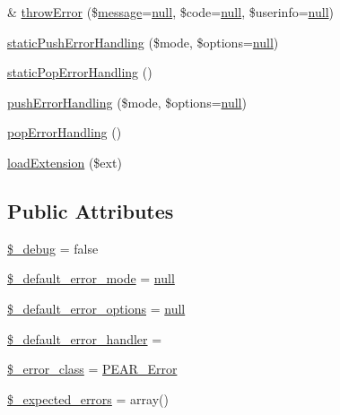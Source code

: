 \begin{DoxyCompactItemize}
\item 
\& \hyperlink{classPEAR_a146f08ee812450913835040d43b2c832}{throw\+Error} (\$\hyperlink{classmessage}{message}=\hyperlink{modernizr_8min_8js_a286f9ec831c5e676eeb493248eab9575}{null}, \$code=\hyperlink{modernizr_8min_8js_a286f9ec831c5e676eeb493248eab9575}{null}, \$userinfo=\hyperlink{modernizr_8min_8js_a286f9ec831c5e676eeb493248eab9575}{null})
\item 
\hyperlink{classPEAR_a5bfc268ba255bb88c2f98bb5f9f0a124}{static\+Push\+Error\+Handling} (\$mode, \$options=\hyperlink{modernizr_8min_8js_a286f9ec831c5e676eeb493248eab9575}{null})
\item 
\hyperlink{classPEAR_ad558eaf2cadc1eb2afa180f7a75bcab3}{static\+Pop\+Error\+Handling} ()
\item 
\hyperlink{classPEAR_a44c791bbf9e490da1b053dcd075fd285}{push\+Error\+Handling} (\$mode, \$options=\hyperlink{modernizr_8min_8js_a286f9ec831c5e676eeb493248eab9575}{null})
\item 
\hyperlink{classPEAR_adc1bc0e4afb5652ad5c42bbd82b7a353}{pop\+Error\+Handling} ()
\item 
\hyperlink{classPEAR_a0c1ee79fa15f1d8ac1b24686a3d3fe44}{load\+Extension} (\$ext)
\end{DoxyCompactItemize}
\subsection*{Public Attributes}
\begin{DoxyCompactItemize}
\item 
\hyperlink{classPEAR_ae715267905b370968c01b81c9fda0bfe}{\$\+\_\+debug} = false
\item 
\hyperlink{classPEAR_a6b3ff3d78a7b1d62c0de6b1190046a89}{\$\+\_\+default\+\_\+error\+\_\+mode} = \hyperlink{modernizr_8min_8js_a286f9ec831c5e676eeb493248eab9575}{null}
\item 
\hyperlink{classPEAR_ac71147b819daa267f29980e941efa23c}{\$\+\_\+default\+\_\+error\+\_\+options} = \hyperlink{modernizr_8min_8js_a286f9ec831c5e676eeb493248eab9575}{null}
\item 
\hyperlink{classPEAR_acacb3a3941983155bd31bdb94982e4f3}{\$\+\_\+default\+\_\+error\+\_\+handler} = \textquotesingle{}\textquotesingle{}
\item 
\hyperlink{classPEAR_a6519b9822433b9dc3db0def7508e2b61}{\$\+\_\+error\+\_\+class} = \textquotesingle{}\hyperlink{classPEAR__Error}{P\+E\+A\+R\+\_\+\+Error}\textquotesingle{}
\item 
\hyperlink{classPEAR_ae20c719eaa8316ed0bd6cc83eaa6d0ac}{\$\+\_\+expected\+\_\+errors} = array()
\end{DoxyCompactItemize}


